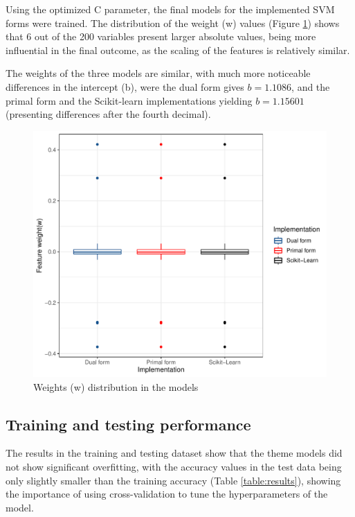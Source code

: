 \documentclass[11pt,twocolumn,letterpaper]{article}
\begin{document}
Using the optimized C parameter, the final models for the implemented SVM forms were trained. The distribution of the weight (w) values (Figure \ref{fig:weights}) shows that 6 out of the 200 variables present larger absolute values, being more influential in the final outcome, as the scaling of the features is relatively similar.

The weights of the three models are similar, with much more noticeable differences in the intercept (b), were the dual form gives $b = 1.1086$, and the primal form and the Scikit-learn implementations yielding $b=1.15601$ (presenting differences after the fourth decimal).

\begin{figure}[h]
	\begin{center}
		\includegraphics[width=1.0\linewidth]{weights.pdf}
	\end{center}
	\caption{Weights (w) distribution in the models}
	\label{fig:weights}
\end{figure}

\subsection{Training and testing performance}

The results in the training and testing dataset show that the theme models did not show significant overfitting, with the accuracy values in the test data being only slightly smaller than the training accuracy (Table \ref{table:results}), showing the importance of using cross-validation to tune the hyperparameters of the model.
\end{document}
